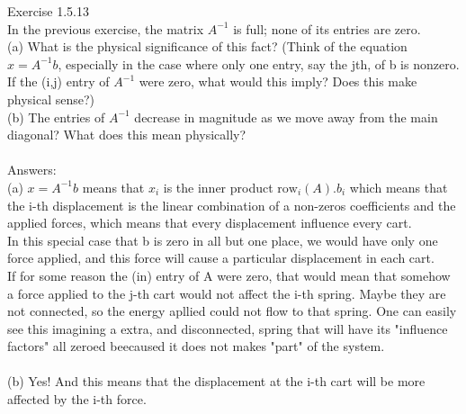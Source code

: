 \documentclass{article}
\begin{document}
	Exercise 1.5.13\\
	In the previous exercise, the matrix $A^{-1}$ is full; none of its entries are zero.\\ 
	(a) What is the physical significance of this fact? (Think of the equation $x = A^{-1}b$, 
	especially in the case where only one entry, say the jth, of b is nonzero. If the 
	(i,j) entry of $A^{-1}$ were zero, what would this imply? Does this make physical 
	sense?)\\ 
	(b) The entries of $A^{-1}$ decrease in magnitude as we move away from the main 
	diagonal? What does this mean physically?\\	
	\\
	Answers:\\
	(a) $x = A^{-1}b$ means that $x_{i}$ is the inner product $\text{row}_i(A).b_i$ which means that the i-th displacement is the linear combination of a non-zeros coefficients and the applied forces, which means that every displacement influence every cart.\\
	In this special case that b is zero in all but one place, we would have only one force applied, and this force will cause a particular displacement in each cart.\\
	If for some reason the (in) entry of A were zero, that would mean that somehow a force applied to the j-th cart would not affect the i-th spring. Maybe they are not connected, so the energy apllied could not flow to that spring. One can easily see this imagining a extra, and disconnected, spring that will have its "influence factors" all zeroed beecaused it does not makes "part" of the system.\\
	\\
	(b) Yes! And this means that the displacement at the i-th cart will be more affected by the i-th force.
\end{document}
